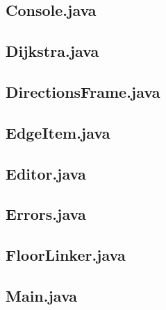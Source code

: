 \subsection{Console.java}
\begin{lgrind}

\end{lgrind}

\subsection{Dijkstra.java}
\begin{lgrind}

\end{lgrind}

\subsection{DirectionsFrame.java}
\begin{lgrind}

\end{lgrind}

\subsection{EdgeItem.java}
\begin{lgrind}

\end{lgrind}

\subsection{Editor.java}
\begin{lgrind}

\end{lgrind}

\subsection{Errors.java}
\begin{lgrind}

\end{lgrind}

\subsection{FloorLinker.java}
\begin{lgrind}

\end{lgrind}

\subsection{Main.java}
\begin{lgrind}

\end{lgrind}

